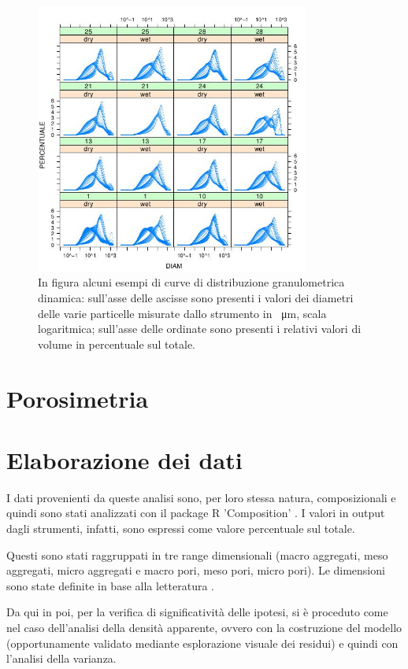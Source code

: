 \documentclass[11pt, a4paper, openright, titlepage, final, language = italian]{book}
\begin{document}
\begin{figure}[ht]
  \centering
  \includegraphics[width=0.8\textwidth]{../foto/distropisa.jpeg}
  \caption{In figura alcuni esempi di curve di distribuzione
    granulometrica dinamica: sull'asse delle ascisse sono presenti i valori dei
  diametri delle varie particelle misurate dallo strumento in
  \SI{}{\micro\metre}, scala logaritmica; sull'asse delle ordinate
  sono presenti i relativi valori di volume in percentuale sul totale.}
\end{figure}

\section{Porosimetria}

\section{Elaborazione dei dati}
I dati provenienti da queste analisi sono, per loro stessa natura,
composizionali e quindi sono stati analizzati con il package R
'Composition' \citep{compositional}.  I valori in output dagli
strumenti, infatti, sono espressi come valore percentuale sul totale.

Questi sono stati raggruppati in tre range dimensionali (macro
aggregati, meso aggregati, micro aggregati e macro pori, meso pori,
micro pori). Le dimensioni sono state definite in base alla
letteratura \citep{la letteratura}.

Da qui in poi, per la verifica di significativit\`a delle ipotesi, si
\`e proceduto come nel caso dell'analisi della densit\`a apparente,
ovvero con la costruzione del modello (opportunamente validato
mediante esplorazione visuale dei residui) e quindi con l'analisi
della varianza.
\end{document}

